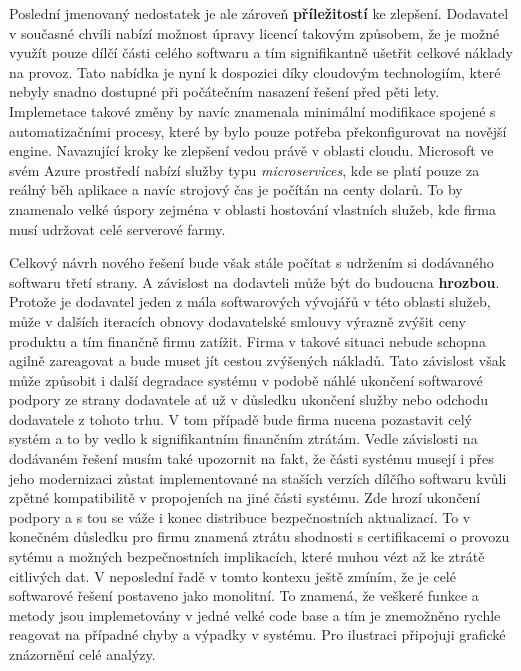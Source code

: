 \documentclass[12pt]{article}
\begin{document}
\begin{sloppypar}
\begin{spacing}{1.15}
        Poslední jmenovaný nedostatek je ale zároveň \textbf{příležitostí} ke
        zlepšení. Dodavatel v současné chvíli nabízí možnost úpravy licencí
        takovým způsobem, že je možné využít pouze dílčí části celého softwaru a
        tím signifikantně ušetřit celkové náklady na provoz. Tato nabídka je
        nyní k dospozici díky cloudovým technologiím, které nebyly snadno
        dostupné při počátečním nasazení řešení před pěti lety. Implemetace takové 
        změny by navíc znamenala minimální modifikace spojené s automatizačními 
        procesy, které by bylo pouze potřeba překonfigurovat na novější engine. 
        Navazující kroky ke zlepšení vedou právě v oblasti cloudu. Microsoft ve
        svém Azure prostředí nabízí služby typu \textit{microservices}, kde se
        platí pouze za reálný běh aplikace a navíc strojový čas je počítán na
        centy dolarů. To by znamenalo velké úspory zejména v oblasti hostování
        vlastních služeb, kde firma musí udržovat celé serverové farmy. 

        Celkový návrh nového řešení bude však stále počítat s udržením si
        dodávaného softwaru třetí strany. A závislost na dodavteli může být
        do budoucna \textbf{hrozbou}. Protože je dodavatel jeden z mála
        softwarových vývojářů v této oblasti služeb, může v dalších iteracích
        obnovy dodavatelské smlouvy výrazně zvýšit ceny produktu a tím finančně 
        firmu zatížit. Firma v takové situaci nebude schopna agilně zareagovat a
        bude muset jít cestou zvýšených nákladů. Tato závislost však může
        způsobit i další degradace systému v podobě náhlé ukončení softwarové
        podpory ze strany dodavatele ať už v důsledku ukončení služby nebo
        odchodu dodavatele z tohoto trhu. V tom případě bude firma nucena
        pozastavit celý systém a to by vedlo k signifikantním finančním ztrátám.
        Vedle závislosti na dodávaném řešení musím také upozornit na fakt, že
        části systému musejí i přes jeho modernizaci zůstat implementované na
        staších verzích dílčího softwaru kvůli zpětné kompatibilitě v propojeních
        na jiné části systému. Zde hrozí ukončení podpory a s tou se váže i
        konec distribuce bezpečnostních aktualizací. To v konečném důsledku
        pro firmu znamená ztrátu shodnosti s certifikacemi o provozu sytému a
        možných bezpečnostních implikacích, které muhou vézt až ke ztrátě
        citlivých dat. V neposlední řadě v tomto kontexu ještě zmíním, že je celé
        softwarové řešení postaveno jako monolitní. To znamená, že veškeré
        funkce a metody jsou implemetovány v jedné velké code base a tím je
        znemožněno rychle reagovat na případné chyby a výpadky v systému. Pro 
        ilustraci připojuji grafické znázornění celé analýzy.


\end{spacing}
\end{sloppypar}
\end{document}
